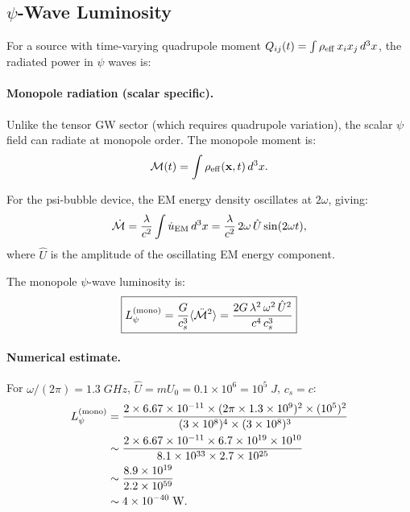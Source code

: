 \documentclass[aps,prd,twocolumn,superscriptaddress,floatfix,nofootinbib]{revtex4-2}
\newcommand{\lam}{\lambda}
\begin{document}
\subsection{$\psi$-Wave Luminosity}\label{sec:luminosity}

For a source with time-varying quadrupole moment
$Q_{ij}(t) = \int \rho_{\rm eff}\,x_i x_j\,d^3x$, the radiated power
in $\psi$ waves is:

\paragraph{Monopole radiation (scalar specific).}
Unlike the tensor GW sector (which requires quadrupole variation), the
scalar $\psi$ field can radiate at monopole order. The monopole moment is:
\begin{equation}
\mathcal{M}(t) = \int \rho_{\rm eff}(\mathbf{x},t)\,d^3x.
\label{eq:monopole}
\end{equation}

For the psi-bubble device, the EM energy density oscillates at $2\omega$,
giving:
\begin{equation}
\dot{\mathcal{M}} = \frac{\lam}{c^2}\int \dot{u}_{\rm EM}\,d^3x
= \frac{\lam}{c^2}\,2\omega\,\hat{U}\sin(2\omega t),
\label{eq:Mdot}
\end{equation}
where $\hat{U}$ is the amplitude of the oscillating EM energy component.

The monopole $\psi$-wave luminosity is:
\begin{equation}
\boxed{
L_\psi^{(\rm mono)} = \frac{G}{c_s^3}\langle\ddot{\mathcal{M}}^2\rangle
= \frac{2G\,\lam^2\,\omega^2\,\hat{U}^2}{c^4\,c_s^3}
}
\label{eq:L-psi-mono}
\end{equation}

\paragraph{Numerical estimate.} For $\omega/(2\pi) = 1.3\;\si{GHz}$,
$\hat{U} = mU_0 = 0.1 \times 10^6 = 10^5\;\si{J}$, $c_s = c$:
\begin{align}
L_\psi^{(\rm mono)} &= \frac{2 \times 6.67\times10^{-11}
\times (2\pi\times1.3\times10^9)^2 \times (10^5)^2}
{(3\times10^8)^4 \times (3\times10^8)^3} \notag\\
&\sim \frac{2 \times 6.67\times10^{-11} \times 6.7\times10^{19}
\times 10^{10}}{8.1\times10^{33} \times 2.7\times10^{25}} \notag\\
&\sim \frac{8.9\times10^{19}}{2.2\times10^{59}} \notag\\
&\sim 4 \times 10^{-40}\;\si{W}.
\label{eq:L-psi-numerical}
\end{align}
\end{document}
